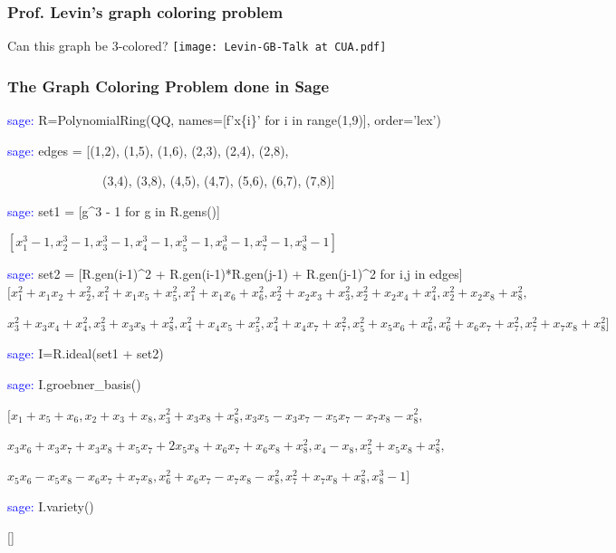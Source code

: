 \documentclass{beamer}
\begin{document}
\begin{frame}[fragile]
\frametitle{Prof. Levin's graph coloring problem}
Can this graph be 3-colored?
\vskip 20pt
\texttt{[image: Levin-GB-Talk at CUA.pdf]}
\end{frame}

\begin{frame}
\frametitle{The Graph Coloring Problem done in Sage}
\begin{semiverbatim}
\scriptsize
\textcolor{blue}{sage:} R=PolynomialRing(QQ, names=[f'x\{i\}' for i in range(1,9)], order='lex')

\textcolor{blue}{sage:} edges = [(1,2), (1,5), (1,6), (2,3), (2,4), (2,8),

\ \ \ \ \ \ \ \ \ \ \ \ \ \ \        (3,4), (3,8), (4,5), (4,7), (5,6), (6,7), (7,8)]


\textcolor{blue}{sage:} set1 = [g\^{}3 - 1 for g in R.gens()]

$\left[x_{1}^{3} - 1, x_{2}^{3} - 1, x_{3}^{3} - 1, x_{4}^{3} - 1, x_{5}^{3} - 1, x_{6}^{3} - 1, x_{7}^{3} - 1, x_{8}^{3} - 1\right]$


\textcolor{blue}{sage:} set2 = [R.gen(i-1)\^{}2 + R.gen(i-1)*R.gen(j-1) + R.gen(j-1)\^{}2 for i,j in edges]
$[x_{1}^{2} + x_{1} x_{2} + x_{2}^{2}, x_{1}^{2} + x_{1} x_{5} + x_{5}^{2}, x_{1}^{2} + x_{1} x_{6} + x_{6}^{2}, x_{2}^{2} + x_{2} x_{3} + x_{3}^{2}, x_{2}^{2} + x_{2} x_{4} + x_{4}^{2}, x_{2}^{2} + x_{2} x_{8} + x_{8}^{2},$

$x_{3}^{2} + x_{3} x_{4} + x_{4}^{2}, x_{3}^{2} + x_{3} x_{8} + x_{8}^{2}, x_{4}^{2} + x_{4} x_{5} + x_{5}^{2}, x_{4}^{2} + x_{4} x_{7} + x_{7}^{2}, x_{5}^{2} + x_{5} x_{6} + x_{6}^{2}, x_{6}^{2} + x_{6} x_{7} + x_{7}^{2}, x_{7}^{2} + x_{7} x_{8} + x_{8}^{2}]$

\textcolor{blue}{sage:} I=R.ideal(set1 + set2)

\textcolor{blue}{sage:} I.groebner\_basis()

$[x_{1} + x_{5} + x_{6}, x_{2} + x_{3} + x_{8}, x_{3}^{2} + x_{3} x_{8} + x_{8}^{2}, x_{3} x_{5} - x_{3} x_{7} - x_{5} x_{7} - x_{7} x_{8} - x_{8}^{2},$

$x_{3} x_{6} + x_{3} x_{7} + x_{3} x_{8} + x_{5} x_{7} + 2 x_{5} x_{8} + x_{6} x_{7} + x_{6} x_{8} + x_{8}^{2}, x_{4} - x_{8}, x_{5}^{2} + x_{5} x_{8} + x_{8}^{2},$

$x_{5} x_{6} - x_{5} x_{8} - x_{6} x_{7} + x_{7} x_{8}, x_{6}^{2} + x_{6} x_{7} - x_{7} x_{8} - x_{8}^{2}, x_{7}^{2} + x_{7} x_{8} + x_{8}^{2}, x_{8}^{3} - 1]$

\textcolor{blue}{sage:} I.variety()

[]


\end{semiverbatim}
\end{frame}
\end{document}
